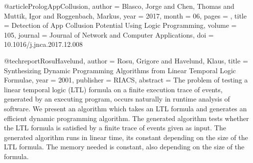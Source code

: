 \documentclass[runningheads]{llncs}
\begin{document}
@article{PrologAppCollusion,
	author = {Blasco, Jorge and Chen, Thomas and Muttik, Igor and Roggenbach, Markus},
	year = {2017},
	month = {06},
	pages = {},
	title = {Detection of App Collusion Potential Using Logic Programming},
	volume = {105},
	journal = {Journal of Network and Computer Applications},
	doi = {10.1016/j.jnca.2017.12.008}
}

@techreport{RosuHavelund,
	author = {Rosu, Grigore and Havelund, Klaus},
	title = {Synthesizing Dynamic Programming Algorithms from Linear Temporal Logic Formulae},
	year = {2001},
	publisher = {RIACS},
	abstract = {The problem of testing a linear temporal logic (LTL) formula on a finite execution trace of events, generated by an executing program, occurs naturally in runtime analysis of software. We present an algorithm which takes an LTL formula and generates an efficient dynamic programming algorithm. The generated algorithm tests whether the LTL formula is satisfied by a finite trace of events given as input. The generated algorithm runs in linear time, its constant depending on the size of the LTL formula. The memory needed is constant, also depending on the size of the formula.}
}
\end{document}
